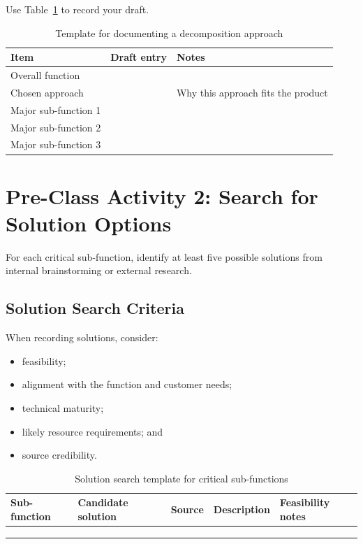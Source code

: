 Use Table~\ref{tab:session9-decomposition-template} to record your draft.

\begin{table}[htbp]
\centering
\caption{Template for documenting a decomposition approach}
\label{tab:session9-decomposition-template}
\renewcommand{\arraystretch}{1.2}
\begin{tabularx}{\textwidth}{|>{\raggedright\arraybackslash}p{}|>{\raggedright\arraybackslash}p{}|X|}
\hline
\textbf{Item} & \textbf{Draft entry} & \textbf{Notes} \\
\hline
Overall function &  &  \\
\hline
Chosen approach &  & Why this approach fits the product \\
\hline
Major sub-function 1 &  &  \\
\hline
Major sub-function 2 &  &  \\
\hline
Major sub-function 3 &  &  \\
\hline
\end{tabularx}
\end{table}

\section{Pre-Class Activity 2: Search for Solution Options}

For each critical sub-function, identify at least five possible solutions from internal brainstorming or external research.

\subsection{Solution Search Criteria}

When recording solutions, consider:
\begin{itemize}
    \item feasibility;
    \item alignment with the function and customer needs;
    \item technical maturity;
    \item likely resource requirements; and
    \item source credibility.
\end{itemize}

\begin{table}[htbp]
\centering
\caption{Solution search template for critical sub-functions}
\label{tab:session9-solution-template}
\renewcommand{\arraystretch}{1.2}
\begin{tabularx}{\textwidth}{|>{\raggedright\arraybackslash}p{}|>{\raggedright\arraybackslash}p{}|>{\raggedright\arraybackslash}p{}|X|>{\raggedright\arraybackslash}p{}|}
\hline
\textbf{Sub-function} & \textbf{Candidate solution} & \textbf{Source} & \textbf{Description} & \textbf{Feasibility notes} \\
\hline
 &  &  &  &  \\
\hline
 &  &  &  &  \\
\hline
 &  &  &  &  \\
\hline
\end{tabularx}
\end{table}

